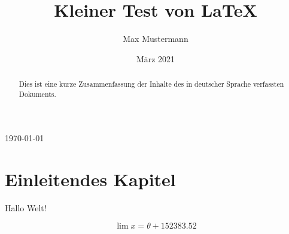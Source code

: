 \documentclass{article}
\title{Kleiner Test von LaTeX}
\author{Max Mustermann}
\date{März 2021}
\begin{document}
   \maketitle

   \today
\tableofcontents

\vspace{2cm} %

\begin{abstract}
Dies ist eine kurze Zusammenfassung der Inhalte des in deutscher Sprache
verfassten Dokuments.
\end{abstract}

\section{Einleitendes Kapitel}

Hallo Welt!

\[ \lim x =  \theta + 152383.52 \]
\end{document}
